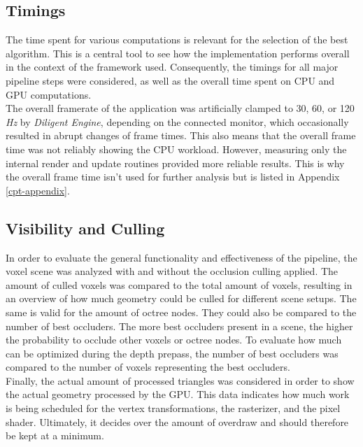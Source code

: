 \subsection*{Timings} \label{subsec-timings}

The time spent for various computations is relevant for the selection of the best algorithm. This is a central 
tool to see how the implementation performs overall in the context of the framework used. Consequently, the 
timings for all major pipeline steps were considered, as well as the overall time spent on \ac{CPU} and \ac{GPU} 
computations. \\

\noindent 
The overall framerate of the application was artificially clamped to 30, 60, or 120 \emph{Hz} by \emph{Diligent Engine}, 
depending on the connected monitor, which occasionally resulted in abrupt changes of frame times. This also means 
that the overall frame time was not reliably showing the \ac{CPU} workload. However, measuring only the internal render 
and update routines provided more reliable results. This is why the overall frame time isn't used for further analysis 
but is listed in Appendix \ref{cpt-appendix}.


\subsection*{Visibility and Culling} \label{subsec-visibility-and-culling}

In order to evaluate the general functionality and effectiveness of the pipeline, the voxel scene was analyzed 
with and without the occlusion culling applied. The amount of culled voxels was compared to the total amount of 
voxels, resulting in an overview of how much geometry could be culled for different scene setups. The same is 
valid for the amount of octree nodes. They could also be compared to the number of best occluders. The more best 
occluders present in a scene, the higher the probability to occlude other voxels or octree nodes. To evaluate 
how much can be optimized during the depth prepass, the number of best occluders was compared to the number 
of voxels representing the best occluders. \\

\noindent
Finally, the actual amount of processed triangles was considered in order to show the actual geometry processed 
by the \ac{GPU}. This data indicates how much work is being scheduled for the vertex transformations, the rasterizer, 
and the pixel shader. Ultimately, it decides over the amount of overdraw and should therefore be kept at a minimum.


